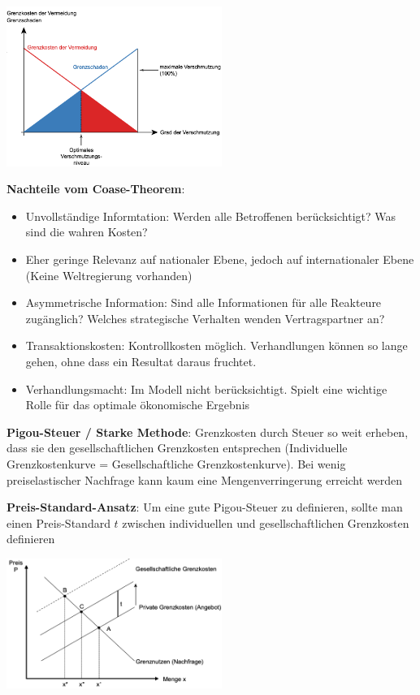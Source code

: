 \documentclass[9pt, landscape, fleqn]{scrartcl}
\begin{document}
\begin{multicols*}{3}
\begin{center}
    \includegraphics[width=7cm]{Coarse_Modell.png}
\end{center}



\textbf{Nachteile vom Coase-Theorem}:

\begin{itemize}
    \item Unvollständige Informtation: Werden alle Betroffenen berücksichtigt? Was sind die wahren Kosten?
    \item Eher geringe Relevanz auf nationaler Ebene, jedoch auf internationaler Ebene (Keine Weltregierung vorhanden)
    \item Asymmetrische Information: Sind alle Informationen für alle Reakteure zugänglich? Welches strategische Verhalten wenden Vertragspartner an?
    \item Transaktionskosten: Kontrollkosten möglich. Verhandlungen können so lange gehen, ohne dass ein Resultat daraus fruchtet.
    \item Verhandlungsmacht: Im Modell nicht berücksichtigt. Spielt eine wichtige Rolle für das optimale ökonomische Ergebnis 
\end{itemize}

\textbf{Pigou-Steuer / Starke Methode}: Grenzkosten durch Steuer so weit erheben, dass sie den gesellschaftlichen Grenzkosten entsprechen (Individuelle Grenzkostenkurve = Gesellschaftliche Grenzkostenkurve). Bei wenig preiselastischer Nachfrage kann kaum eine Mengenverringerung erreicht werden \newline 

\textbf{Preis-Standard-Ansatz}: Um eine gute Pigou-Steuer zu definieren, sollte man einen Preis-Standard $t$ zwischen individuellen und gesellschaftlichen Grenzkosten definieren

\begin{center}
    \includegraphics[width=7cm]{Preis-Standard-Ansatz.png}
\end{center}


\end{multicols*}
\end{document}
